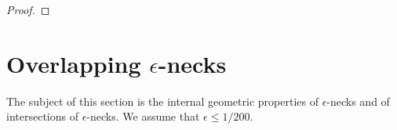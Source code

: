 \begin{proof}
\sketch
{}
\end{proof}






\section{Overlapping $\epsilon$-necks}

The subject of this section is the internal geometric properties of
$\epsilon$-necks and of intersections of $\epsilon$-necks. We assume that
$\epsilon\le 1/200$.


\begin{proposition}
\label{prop:overlapping-necks-properties}
\label{S2intersection}


\end{proposition}
